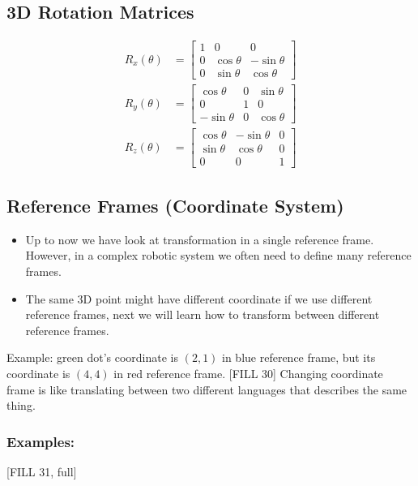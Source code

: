 \documentclass[10pt]{article}
\begin{document}
\subsection*{3D Rotation Matrices}
\begin{align*}
R_x (\theta) &= \begin{bmatrix} 1 & 0 & 0 \\ 0 & \cos \theta & -\sin \theta \\ 0 & \sin \theta & \cos \theta \end{bmatrix}\\
R_y (\theta) &= \begin{bmatrix} \cos \theta & 0 & \sin \theta \\ 0 & 1 & 0 \\ -\sin \theta & 0 & \cos \theta \end{bmatrix}\\
R_z (\theta) &= \begin{bmatrix} \cos \theta & -\sin \theta & 0 \\ \sin \theta & \cos \theta & 0 \\ 0 & 0 & 1 \end{bmatrix}
\end{align*}

\subsection*{Reference Frames (Coordinate System)}
\begin{itemize}
	\item Up to now we have look at transformation in a single reference frame.  However, in a complex robotic system we often need to define many reference frames.
	\item The same 3D point might have different coordinate if we use different reference frames, next we will learn how to transform between different reference frames.
\end{itemize}
Example: green dot's coordinate is $(2, 1)$ in blue reference frame, but its coordinate is $(4, 4)$ in red reference frame.
[FILL 30]
Changing coordinate frame is like translating between two different languages that describes the same thing.

\subsubsection*{Examples:}
[FILL 31, full]
\end{document}
